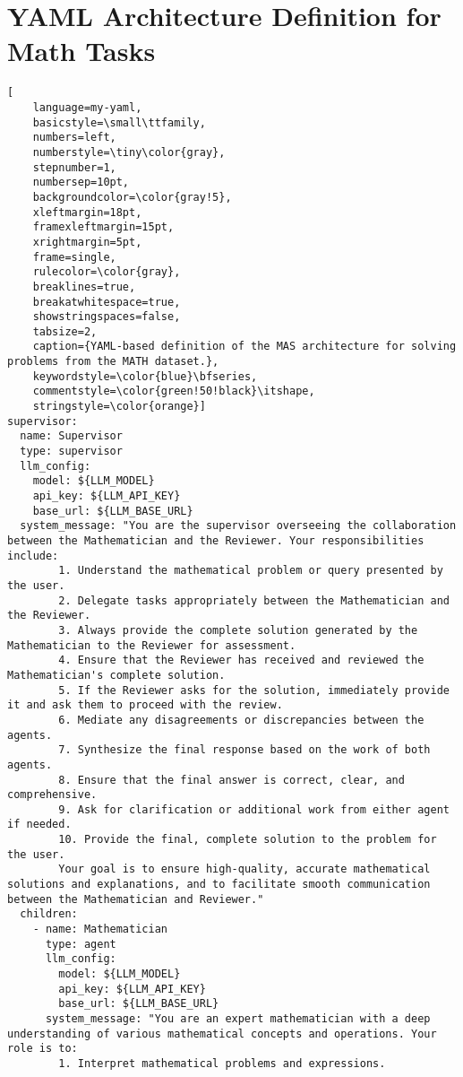 \section{YAML Architecture Definition for Math Tasks}\label{appendix:yaml-math}
\begin{lstlisting}[
    language=my-yaml,
    basicstyle=\small\ttfamily,
    numbers=left,
    numberstyle=\tiny\color{gray},
    stepnumber=1,
    numbersep=10pt,
    backgroundcolor=\color{gray!5},
    xleftmargin=18pt,
    framexleftmargin=15pt,
    xrightmargin=5pt,
    frame=single,
    rulecolor=\color{gray},
    breaklines=true,
    breakatwhitespace=true,
    showstringspaces=false,
    tabsize=2,
    caption={YAML-based definition of the MAS architecture for solving problems from the MATH dataset.},
    keywordstyle=\color{blue}\bfseries,
    commentstyle=\color{green!50!black}\itshape,
    stringstyle=\color{orange}]
supervisor:
  name: Supervisor
  type: supervisor
  llm_config:
    model: ${LLM_MODEL}
    api_key: ${LLM_API_KEY}
    base_url: ${LLM_BASE_URL}
  system_message: "You are the supervisor overseeing the collaboration between the Mathematician and the Reviewer. Your responsibilities include:
        1. Understand the mathematical problem or query presented by the user.
        2. Delegate tasks appropriately between the Mathematician and the Reviewer.
        3. Always provide the complete solution generated by the Mathematician to the Reviewer for assessment.
        4. Ensure that the Reviewer has received and reviewed the Mathematician's complete solution.
        5. If the Reviewer asks for the solution, immediately provide it and ask them to proceed with the review.
        6. Mediate any disagreements or discrepancies between the agents.
        7. Synthesize the final response based on the work of both agents.
        8. Ensure that the final answer is correct, clear, and comprehensive.
        9. Ask for clarification or additional work from either agent if needed.
        10. Provide the final, complete solution to the problem for the user.
        Your goal is to ensure high-quality, accurate mathematical solutions and explanations, and to facilitate smooth communication between the Mathematician and Reviewer."
  children:
    - name: Mathematician
      type: agent
      llm_config:
        model: ${LLM_MODEL}
        api_key: ${LLM_API_KEY}
        base_url: ${LLM_BASE_URL}
      system_message: "You are an expert mathematician with a deep understanding of various mathematical concepts and operations. Your role is to:
        1. Interpret mathematical problems and expressions.

\end{lstlisting}
